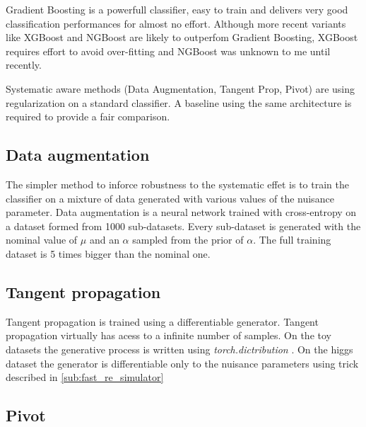 Gradient Boosting is a powerfull classifier, easy to train and delivers very good classification performances for almost no effort.
Although more recent variants like XGBoost \needcite and NGBoost \needcite are likely to outperfom Gradient Boosting, XGBoost requires effort to avoid over-fitting and NGBoost was unknown to me until recently.

Systematic aware methods (Data Augmentation, Tangent Prop, Pivot) are using regularization on a standard classifier.
A baseline using the same architecture is required to provide a fair comparison.







\subsection{Data augmentation} %
\label{sub:data_augmentation}


The simpler method to inforce robustness to the systematic effet is to train the classifier on a mixture of data generated with various values of the nuisance parameter.
Data augmentation is a neural network trained with cross-entropy on a dataset formed from 1000 sub-datasets.
Every sub-dataset is generated with the nominal value of $\mu$ and an $\alpha$ sampled from the prior of $\alpha$.
The full training dataset is 5 times bigger than the nominal one.







\subsection{Tangent propagation} %
\label{sub:tangent_propagation}

Tangent propagation is trained using a differentiable generator.
Tangent propagation virtually has acess to a infinite number of samples.
On the toy datasets the generative process is written using \emph{torch.dictribution} .
On the higgs dataset the generator is differentiable only to the nuisance parameters using trick described in \autoref{sub:fast_re_simulator} 







\subsection{Pivot} %
\label{sub:pivot}


